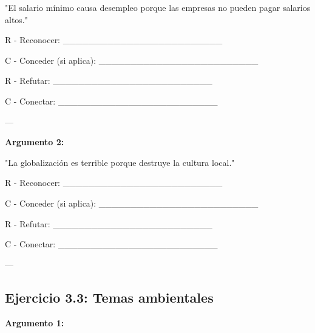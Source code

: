 \documentclass[a4paper,11pt]{article}
\begin{document}
"El salario mínimo causa desempleo porque las empresas no pueden pagar salarios altos."

\vspace{0.2cm}

R - Reconocer: _________________________

\vspace{0.2cm}

C - Conceder (si aplica): _________________________

\vspace{0.2cm}

R - Refutar: _________________________

\vspace{0.2cm}

C - Conectar: _________________________

\vspace{0.2cm}

---

\vspace{0.2cm}

\textbf{Argumento 2:}

"La globalización es terrible porque destruye la cultura local."

\vspace{0.2cm}

R - Reconocer: _________________________

\vspace{0.2cm}

C - Conceder (si aplica): _________________________

\vspace{0.2cm}

R - Refutar: _________________________

\vspace{0.2cm}

C - Conectar: _________________________

\vspace{0.2cm}

---

\vspace{0.2cm}

\subsection{Ejercicio 3.3: Temas ambientales}

\vspace{0.2cm}

\textbf{Argumento 1:}
\end{document}
